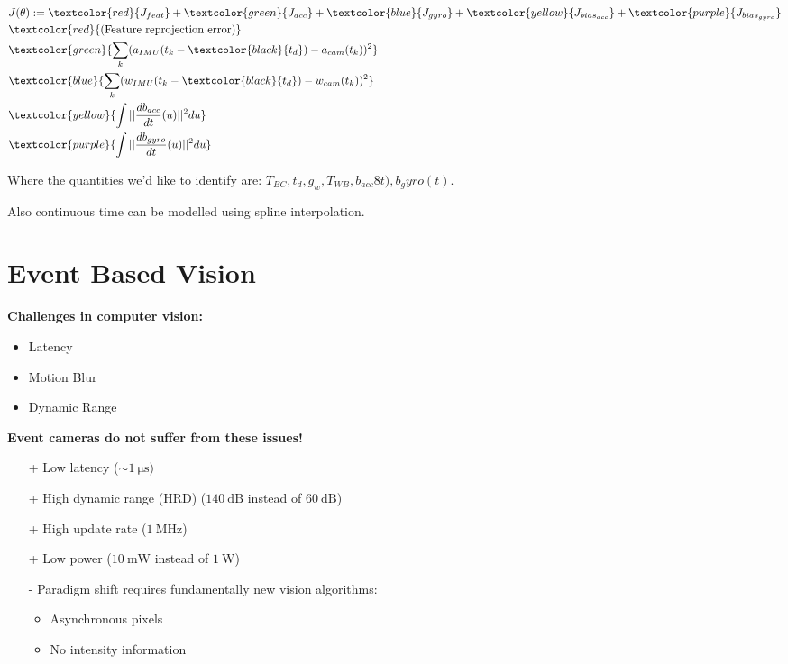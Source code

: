 \documentclass[10pt,a4paper]{scrartcl}
\begin{document}
\begin{multicols*}{2}
\begin{align*}
&J(\theta):=\textcolor{red}{J_{feat}}+\textcolor{green}{J_{acc}}+\textcolor{blue}{J_{gyro}}+\textcolor{yellow}{J_{bias_{acc}}}+\textcolor{purple}{J_{bias_{gyro}}}\\
&\textcolor{red}{\text{(Feature reprojection error)}}\\
&\textcolor{green}{\sum\limits_k(a_{IMU}(t_k-\textcolor{black}{t_d})-a_{cam}(t_k))^2}\\
&\textcolor{blue}{\sum\limits_k(w_{IMU}(t_k-\textcolor{black}{t_d})-w_{cam}(t_k))^2}\\
&\textcolor{yellow}{\int||\frac{db_{acc}}{dt}(u)||^2du}\\
&\textcolor{purple}{\int||\frac{db_{gyro}}{dt}(u)||^2du}
\end{align*}

Where the quantities we'd like to identify are: $T_{BC},t_d,g_w,T_{WB},b_{acc}8t),b_gyro(t)$.

Also continuous time can be modelled using spline interpolation.

\section{Event Based Vision}

\textbf{Challenges in computer vision:}
\begin{itemize}
\item Latency
\item Motion Blur
\item Dynamic Range
\end{itemize}

\textbf{Event cameras do not suffer from these issues!}
\begin{itemize}
\item[+] Low latency ($\sim\SI{1}{\micro\second})$
\item[+] High dynamic range (HRD) ($\SI{140}{\dB}$ instead of $\SI{60}{\dB}$)
\item[+] High update rate ($\SI{1}{\mega\hertz}$)
\item[+] Low power ($\SI{10}{\milli\watt}$ instead of $\SI{1}{\watt}$)
\item[-] Paradigm shift requires fundamentally new vision algorithms:
\begin{itemize}
\item Asynchronous pixels
\item No intensity information
\end{itemize}
\end{itemize}


\end{multicols*}
\end{document}

